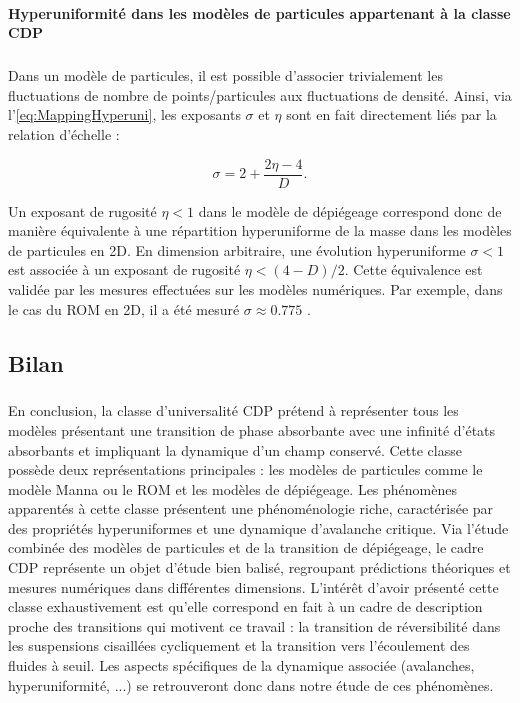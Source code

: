 \paragraph{Hyperuniformité dans les modèles de particules appartenant à la classe CDP}

\subparagraph{}Dans un modèle de particules, il est possible d'associer trivialement les fluctuations de nombre de points/particules aux fluctuations de densité. Ainsi, via l'\autoref{eq:MappingHyperuni}, les exposants $\sigma$ et $\eta$ sont en fait directement liés par la relation d'échelle :

\begin{equation}
	\sigma = 2 + \frac{2\eta - 4}{D}.
	\label{eq:rel_eta_sigma}
\end{equation}

\noindent Un exposant de rugosité $\eta < 1$ dans le modèle de dépiégeage correspond donc de manière équivalente à une répartition hyperuniforme de la masse dans les modèles de particules en 2D. En dimension arbitraire, une évolution hyperuniforme $\sigma < 1$ est associée à un exposant de rugosité $\eta < (4-D)/2$. Cette équivalence est validée par les mesures effectuées sur les modèles numériques. Par exemple, dans le cas du ROM en 2D, il a été mesuré $\sigma \approx 0.775$ \cite{tjhung_hyperuniform_2015, hexner_hyperuniformity_2015, weijs_emergent_2015}.

\subsection{Bilan}

\subparagraph{}En conclusion, la classe d'universalité CDP prétend à représenter tous les modèles présentant une transition de phase absorbante avec une infinité d'états absorbants et impliquant la dynamique d'un champ conservé. Cette classe possède deux représentations principales : les modèles de particules comme le modèle Manna ou le ROM et les modèles de dépiégeage. Les phénomènes apparentés à cette classe présentent une phénoménologie riche, caractérisée par des propriétés hyperuniformes et une dynamique d'avalanche critique. Via l'étude combinée des modèles de particules et de la transition de dépiégeage, le cadre CDP représente un objet d'étude bien balisé, regroupant prédictions théoriques et mesures numériques dans différentes dimensions. L'intérêt d'avoir présenté cette classe exhaustivement est qu'elle correspond en fait à un cadre de description proche des transitions qui motivent ce travail : la transition de réversibilité dans les suspensions cisaillées cycliquement et la transition vers l'écoulement des fluides à seuil. Les aspects spécifiques de la dynamique associée (avalanches, hyperuniformité, ...) se retrouveront donc dans notre étude de ces phénomènes.

